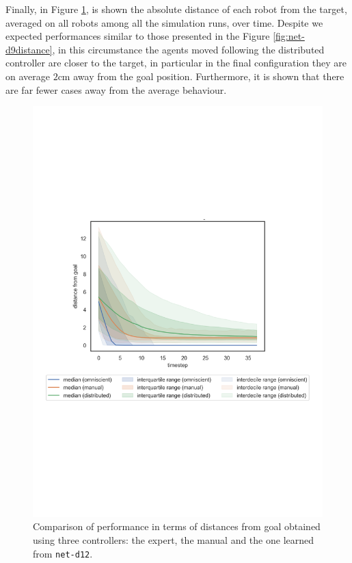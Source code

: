 Finally, in Figure \ref{fig:net-d12distance}, is shown the absolute distance of 
each robot from the target, averaged on all robots among all the simulation runs, 
over time. 
Despite we expected performances similar to those presented in the Figure 
\ref{fig:net-d9distance}, in this circumstance the agents moved following the 
distributed controller are closer to the target, in particular in the final 
configuration they are on average $2$\gls{cm} away from the goal position. 
Furthermore, it is shown that there are far fewer cases away from the average 
behaviour.
\begin{figure}[!htb]
	\centering
	\includegraphics[width=.65\textwidth]{contents/images/net-d12/distances-from-goal-compressed-distributed}%
	\caption[Evaluation of \texttt{net-d1} distances from goal.]{Comparison of 
		performance in terms of distances from goal obtained using three 
		controllers: 
		the expert, the manual and the one learned from \texttt{net-d12}.}
	\label{fig:net-d12distance}
\end{figure}

